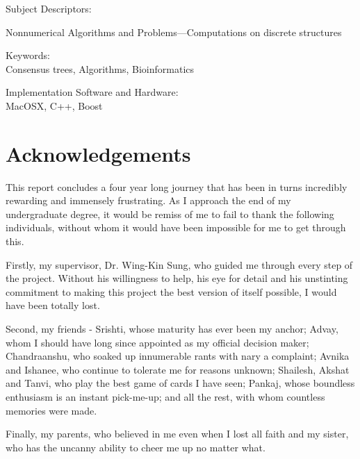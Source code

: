\documentclass[12pt,a4paper]{article}
\begin{document}
    \vspace{1cm}
    Subject Descriptors:
    \begin{description}[labelindent=1cm]
        \item[F.2.2] Nonnumerical Algorithms and Problems---Computations on discrete structures
    \end{description}

    \vspace{0.5cm}
    Keywords:\\[0.2cm]
    \hspace*{1cm}Consensus trees, Algorithms, Bioinformatics

    \vspace{0.5cm}
    Implementation Software and Hardware:\\[0.2cm]
    \hspace*{1cm}MacOSX, C++, Boost
    \newpage

    \section*{Acknowledgements}

    \doublespacing
    This report concludes a four year long journey that has been in turns incredibly rewarding and immensely frustrating. As I approach the end of my undergraduate degree, it would be remiss of me to fail to thank the following individuals, without whom it would have been impossible for me to get through this.

    Firstly, my supervisor, Dr. Wing-Kin Sung, who guided me through every step of the project. Without his willingness to help, his eye for detail and his unstinting commitment to making this project the best version of itself possible, I would have been totally lost.

    Second, my friends - Srishti, whose maturity has ever been my anchor; Advay, whom I should have long since appointed as my official decision maker; Chandraanshu, who soaked up innumerable rants with nary a complaint; Avnika and Ishanee, who continue to tolerate me for reasons unknown; Shailesh, Akshat and Tanvi, who play the best game of cards I have seen; Pankaj, whose boundless enthusiasm is an instant pick-me-up; and all the rest, with whom countless memories were made.

    Finally, my parents, who believed in me even when I lost all faith and my sister, who has the uncanny ability to cheer me up no matter what.
    \newpage

    \onehalfspacing
    \tableofcontents
    \newpage
\end{document}
